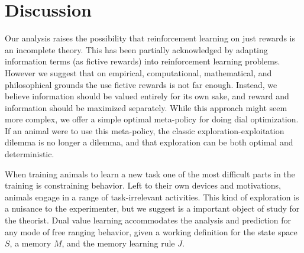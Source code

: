 \documentclass[9pt,twocolumn,twoside]{pnas-new}
\begin{document}




\section*{Discussion}
Our analysis raises the possibility that reinforcement learning on just rewards is an incomplete theory. This has been partially acknowledged by adapting information terms (as fictive rewards) into reinforcement learning problems. However we suggest that on empirical, computational, mathematical, and philosophical grounds the use fictive rewards is not far enough. Instead,  we believe information should be valued entirely for its own sake, and reward and information should be maximized separately. While this approach might seem more complex, we offer a simple optimal meta-policy for doing dial optimization. If an animal were to use this meta-policy, the classic exploration-exploitation dilemma is no longer a dilemma, and that exploration can be both optimal and deterministic.

When training animals to learn a new task one of the most difficult parts in the training is constraining behavior. Left to their own devices and motivations, animals engage in a range of task-irrelevant activities. This kind of exploration is a nuisance to the experimenter, but we suggest is a important object of study for the theorist. Dual value learning accommodates the analysis and prediction for any mode of free ranging behavior, given a working definition for the state space $S$, a memory $M$, and the memory learning rule $J$.  %
\end{document}
